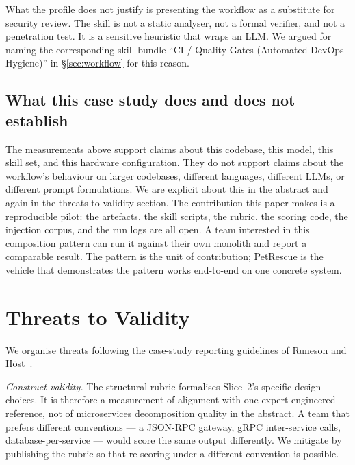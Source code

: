 \documentclass[journal]{IEEEtran}
\begin{document}
What the profile does not justify is presenting the workflow as
a substitute for security review. The skill is not a static
analyser, not a formal verifier, and not a penetration test. It
is a sensitive heuristic that wraps an LLM. We argued for naming
the corresponding skill bundle ``CI / Quality Gates (Automated
DevOps Hygiene)'' in \S\ref{sec:workflow} for this reason.

\subsection{What this case study does and does not establish}

The measurements above support claims about this codebase, this
model, this skill set, and this hardware configuration. They do
not support claims about the workflow's behaviour on larger
codebases, different languages, different LLMs, or different
prompt formulations. We are explicit about this in the abstract
and again in the threats-to-validity section. The contribution
this paper makes is a reproducible pilot: the artefacts, the
skill scripts, the rubric, the scoring code, the injection
corpus, and the run logs are all open. A team interested in this
composition pattern can run it against their own monolith and
report a comparable result. The pattern is the unit of
contribution; PetRescue is the vehicle that demonstrates the
pattern works end-to-end on one concrete system.

\section{Threats to Validity}
\label{sec:threats}

We organise threats following the case-study reporting guidelines
of Runeson and H\"{o}st~\cite{runeson2009casestudy}.

\textit{Construct validity.} The structural rubric formalises
Slice~2's specific design choices. It is therefore a measurement
of alignment with one expert-engineered reference, not of
microservices decomposition quality in the abstract. A team that
prefers different conventions --- a JSON-RPC gateway, gRPC
inter-service calls, database-per-service --- would score the same
output differently. We mitigate by publishing the rubric so that
re-scoring under a different convention is possible.
\end{document}
